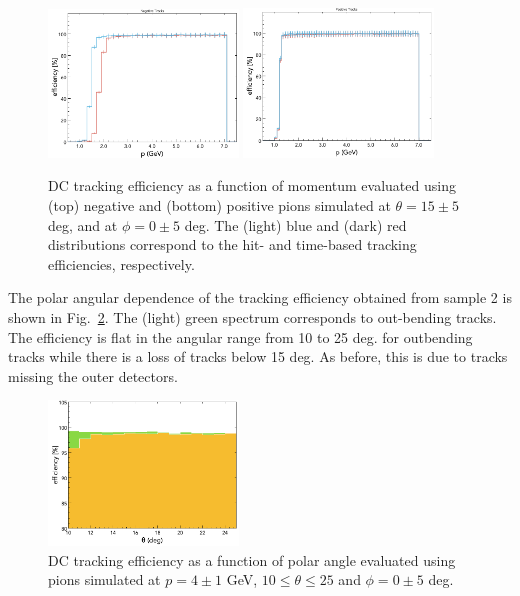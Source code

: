 \begin{figure}
\includegraphics[width=0.45\textwidth]{pics/DCTrkgEffNegTrks.png}
\includegraphics[width=0.45\textwidth]{pics/DCTrkgEffPosTrks.png}
\caption{DC tracking efficiency as a function of momentum evaluated using  (top) negative and (bottom) positive pions simulated at $\theta =15\pm 5$ deg, and at $\phi = 0 \pm 5$ deg. The (light) blue and (dark) red distributions correspond to the hit- and time-based tracking efficiencies, respectively.
}
\label{fig:trkeff}
\end{figure}


The polar angular dependence of the tracking efficiency obtained from sample 2 is shown in Fig.~\ref{fig:trkeffinoutb}.   The (light) green spectrum corresponds to out-bending tracks.  The efficiency is flat in the angular range from 10 to 25 deg. for outbending tracks while there is a loss of tracks below 15 deg.  As before, this is due to tracks missing the outer detectors.  

\begin{figure}
\includegraphics[width=0.45\textwidth]{pics/DCTrkEffvsThetaInandOutbenders.png}
\caption{DC tracking efficiency as a function of polar angle evaluated using  pions  simulated at $p=4\pm 1$ GeV, $10\leq \theta\leq 25$ and $\phi = 0 \pm 5$ deg.
}
\label{fig:trkeffinoutb}
\end{figure}
